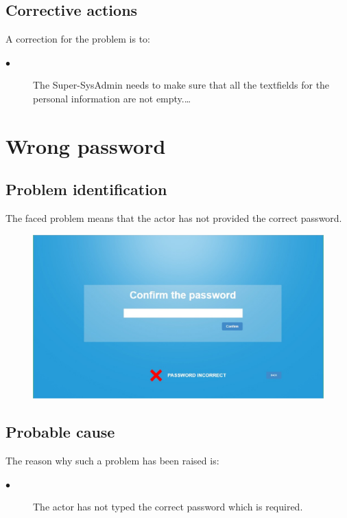 \subsection{Corrective actions}

A correction for the problem is to:\\
\begin{description}
\item[$\bullet$] The Super-SysAdmin needs to make sure that all the textfields
for the personal information are not empty.\ldots

\end{description}


\section{Wrong password} 

\subsection{Problem identification}
The faced problem means that the actor has not provided the correct password.

\begin{figure}[H]
\centering
\includegraphics[width=170mm]{images/wrongpassword.eps}
\caption{\label{overflow}}
\end{figure}
\subsection{Probable cause}

The reason why such a problem has been raised is:\\
\begin{description}
\item[$\bullet$] The actor has not typed the correct password which is
required.
\end{description}


